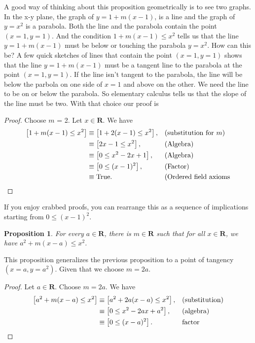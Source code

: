 \documentclass[12pt,fleqn,answers]{article}
\newcommand{\reals}{\mathbf{R}}
\newcommand{\true}{\mathrm{True}}
\newenvironment{myproof}
  {\begin{shaded}\begin{proof}}
  {\end{proof}\end{shaded}}
\newtheorem{prop}{Proposition}
\begin{document}
      A good way of thinking about this proposition geometrically is to see two graphs. In the x-y plane, the graph of  $y = 1 + m(x-1)$, is a line  and the
      graph of $y = x^2$  is a parabola.   Both the line  and the parabola contain the point $(x=1,y=1)$. And the 
      condition $1 + m(x-1) \leq x^2$ tells
      us that the line $y = 1 + m(x-1)$ must be below or touching the parabola $y=x^2$.  How can this be? A few quick sketches of lines that
      contain the point $(x=1,y=1)$  shows that the line $y = 1 + m(x-1)$ must be a tangent line to the parabola at the point $(x=1,y=1)$.  If 
      the line isn't tangent to the parabola, the line will be below the parbola on one side of $x=1$ and above on the other.   We need the
      line to be on or below the parabola.  So   elementary calculus tells us that the slope of the line must be two. With that choice
      our proof is      
       \begin{myproof} Choose $m$ = 2. Let $x\in \reals$. We have
       \begin{align*}
         \left[1 + m(x-1) \leq x^2  \right] &\equiv \left[1+2(x-1) \leq  x^2 \right], && \text{(substitution for $m$)} \\
                                      &\equiv \left[2x-1 \leq x^2 \right], 
                                       &&\text{(Algebra)} \\
                                    &\equiv \left[0 \leq x^2 -2x+1 \right], 
                                       &&\text{(Algebra)} \\
                                    &\equiv \left[0 \leq (x-1)^2 \right], 
                                       &&\text{(Factor)} \\
                                      &\equiv \true. &&\text{(Ordered field axioms} \qedhere
       \end{align*}
       \end{myproof}
       \noindent If you enjoy crabbed proofs, you can rearrange this as a sequence of implications starting from $0 \leq (x-1)^2$. 
   
     \begin{prop} For every $a \in \reals$, there is $m \in \reals$ such 
     that for all $x \in \reals$, we have $a^2 + m(x-a) \leq x^2$.
     \end{prop}
     This proposition generalizes the previous proposition to a point of tangency $(x=a,y=a^2)$. Given that we choose $m=2a$. 

      \begin{myproof} 
      Let $a \in \reals$. Choose $m=2a$. We have
      \begin{align*}
       \left[{a^2+m(x-a) \le x^2} \right]   
       &\equiv \left[a^2+2a(x-a)\le x^2\right], &&\text{(substitution)}\\
      &\equiv \left[0 \le x^2-2ax+a^2\right], &&\text{(algebra)}\\
      &\equiv \left[0 \le (x-a)^2\right]. &&\text{factor}  \qedhere
      \end{align*}
  \end{myproof}
\end{document}

